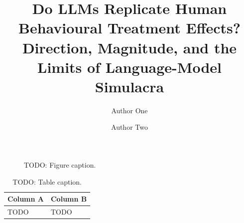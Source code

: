 \documentclass[9pt,twocolumn,twoside,lineno]{pnas-new}
\title{Do LLMs Replicate Human Behavioural Treatment Effects? Direction, Magnitude, and the Limits of Language-Model Simulacra}
\author[a]{Author One}
\author[b]{Author Two}
\affil[a]{Affiliation One}
\affil[b]{Affiliation Two}
\begin{document}
\maketitle
\thispagestyle{firststyle}






\begin{figure}[tbhp]
       \begin{small}
              \begin{center}
              \end{center}
              \caption{TODO: Figure caption.}
              \label{fig:placeholder}
       \end{small}
\end{figure}

\begin{table}[tbhp]
       \centering
       \caption{TODO: Table caption.}
       \label{table:placeholder}
       \begin{tabular}{ll}
              \toprule
              Column A & Column B \\
              \midrule
              TODO & TODO \\
              \bottomrule
       \end{tabular}
\end{table}

\showmatmethods{}

\showacknow{}




\newpage\null\newpage
\end{document}
